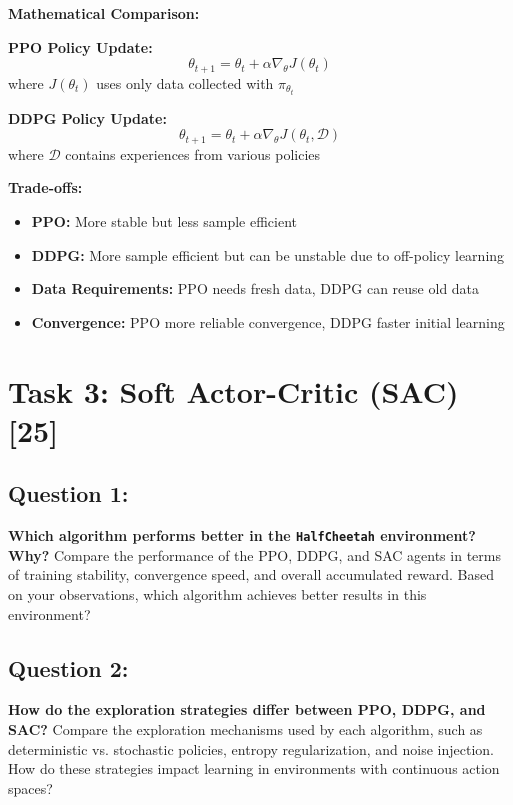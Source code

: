 \documentclass[12pt]{article}
\begin{document}
{{{\textbf{Mathematical Comparison:}

\textbf{PPO Policy Update:}
\[
\theta_{t+1} = \theta_t + \alpha \nabla_\theta J(\theta_t)
\]
where $J(\theta_t)$ uses only data collected with $\pi_{\theta_t}$

\textbf{DDPG Policy Update:}
\[
\theta_{t+1} = \theta_t + \alpha \nabla_\theta J(\theta_t, \mathcal{D})
\]
where $\mathcal{D}$ contains experiences from various policies

\textbf{Trade-offs:}
\begin{itemize}
    \item \textbf{PPO:} More stable but less sample efficient
    \item \textbf{DDPG:} More sample efficient but can be unstable due to off-policy learning
    \item \textbf{Data Requirements:} PPO needs fresh data, DDPG can reuse old data
    \item \textbf{Convergence:} PPO more reliable convergence, DDPG faster initial learning
\end{itemize}

\newpage

\section{Task 3: Soft Actor-Critic (SAC) [25]}

\subsection{Question 1:}
\textbf{Which algorithm performs better in the \texttt{HalfCheetah} environment? Why?}
\newline
Compare the performance of the PPO, DDPG, and SAC agents in terms of training stability, convergence speed, and overall accumulated reward. Based on your observations, which algorithm achieves better results in this environment?


\vspace*{0.3cm}

\subsection{Question 2:}
\textbf{How do the exploration strategies differ between PPO, DDPG, and SAC?}
\newline
Compare the exploration mechanisms used by each algorithm, such as deterministic vs. stochastic policies, entropy regularization, and noise injection. How do these strategies impact learning in environments with continuous action spaces?
\vspace*{0.3cm}

}}}
\end{document}
